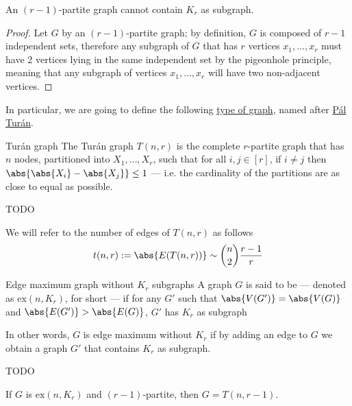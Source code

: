 \documentclass[a4paper, 12pt]{report}
\begin{document}
    \begin{framedprop}[label={partite kr}]{}
        An $(r - 1)$-partite graph cannot contain $K_r$ as subgraph.
    \end{framedprop}
    
    \begin{proof}
        Let $G$ by an $(r-1)$-partite graph; by definition, $G$ is composed of $r - 1$ independent sets, therefore any subgraph of $G$ that has $r$ vertices $x_1, \ldots, x_r$ must have 2 vertices lying in the same independent set by the pigeonhole principle, meaning that any subgraph of vertices $x_1, \ldots, x_r$ will have two non-adjacent vertices.
    \end{proof}

    In particular, we are going to define the following \href{https://en.wikipedia.org/wiki/Tur%C3%A1n_graph}{type of graph}, named after \href{https://en.wikipedia.org/wiki/P%C3%A1l_Tur%C3%A1n}{Pál Turán}.

    \begin{frameddefn}{Turán graph}
        The Turán graph $T(n, r)$ is the complete $r$-partite graph that has $n$ nodes, partitioned into $X_1, \ldots, X_r$, such that for all $i, j \in [r]$, if $i \neq j$ then $\abs{\abs{X_i} - \abs{X_j}} \le 1$ --- i.e. the cardinality of the partitions are as close to equal as possible.
    \end{frameddefn}

    TODO 

    We will refer to the number of edges of $T(n, r)$ as follows  $$t(n, r) := \abs{E(T(n, r))} \sim \binom{n}{2} \dfrac{ r- 1}{r}$$

    \begin{frameddefn}{Edge maximum graph without $K_r$ subgraphs}
        A graph $G$ is said to be  --- denoted as $\mathrm{ex}(n, K_r)$, for short --- if for any $G'$ such that $\abs{V(G')} = \abs{V(G)}$ and $\abs{E(G')} > \abs{E(G)}$, $G'$ has $K_r$ as subgraph
    \end{frameddefn}

    In other words, $G$ is edge maximum without $K_r$ if by adding an edge to $G$ we obtain a graph $G'$ that contains $K_r$ as subgraph.

    TODO 

    \begin{framedprop}{}
        If $G$ is $\mathrm{ex}(n, K_r)$ and $(r-1)$-partite, then $G = T(n, r - 1)$.
    \end{framedprop}
\end{document}
